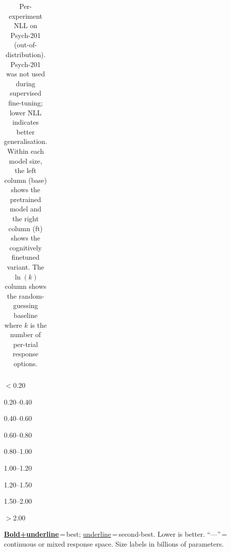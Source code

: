 \documentclass{article}
\begin{document}
\begin{table}
{\begin{tabular}{@{}l l  r@{\;\;}r  r@{\;\;}r  r@{\;\;}r  r@{\;\;}r  r@{\;\;}r  r@{\;\;}r  r@{\;\;}r  r@{\;\;}r  r  r@{}}
\bottomrule
\end{tabular}%
}
\vspace{4pt}
\begin{center}\footnotesize
\colorbox{c1!45}{\strut\hspace{5pt}} \scriptsize$<$0.20 \quad
\colorbox{c2!40}{\strut\hspace{5pt}} \scriptsize 0.20--0.40 \quad
\colorbox{c3!40}{\strut\hspace{5pt}} \scriptsize 0.40--0.60 \quad
\colorbox{c4!45}{\strut\hspace{5pt}} \scriptsize 0.60--0.80 \quad
\colorbox{c5!55}{\strut\hspace{5pt}} \scriptsize 0.80--1.00 \quad
\colorbox{c6!50}{\strut\hspace{5pt}} \scriptsize 1.00--1.20 \quad
\colorbox{c7!45}{\strut\hspace{5pt}} \scriptsize 1.20--1.50 \quad
\colorbox{c8!40}{\strut\hspace{5pt}} \scriptsize 1.50--2.00 \quad
\colorbox{c9!35}{\strut\hspace{5pt}} \scriptsize$>$2.00
\end{center}
\vspace{-2pt}
{\tiny \underline{\textbf{Bold+underline}}\,=\,best; \underline{underline}\,=\,second-best. Lower is better. ``---''\,=\,continuous or mixed response space. Size labels in billions of parameters.}
\caption{Per-experiment NLL on Psych-201 (out-of-distribution). Psych-201 was not used during supervised fine-tuning; lower NLL indicates better generalisation. Within each model size, the left column (base) shows the pretrained model and the right column (ft) shows the cognitively finetuned variant. The $\ln(k)$ column shows the random-guessing baseline where $k$ is the number of per-trial response options.}
\label{tab:psych201_pe_bf16_base_v_ft}
\end{table}
\clearpage
\end{document}
